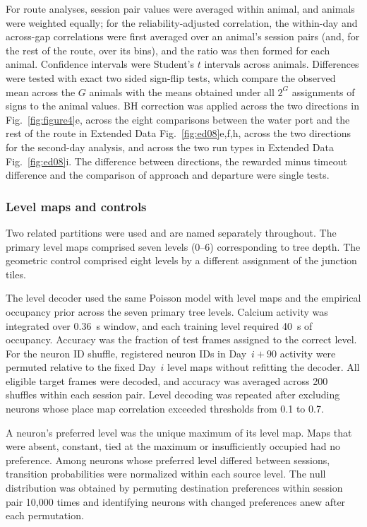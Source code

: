 \documentclass[fleqn,10pt]{wlscirep}
\begin{document}
For route analyses, session pair values were averaged within animal, and animals were weighted equally; for the reliability-adjusted correlation, the within-day and across-gap correlations were first averaged over an animal's session pairs (and, for the rest of the route, over its bins), and the ratio was then formed for each animal. Confidence intervals were Student's $t$ intervals across animals. Differences were tested with exact two sided sign-flip tests, which compare the observed mean across the $G$ animals with the means obtained under all $2^G$ assignments of signs to the animal values. BH correction was applied across the two directions in Fig.~\ref{fig:figure4}e, across the eight comparisons between the water port and the rest of the route in Extended Data Fig.~\ref{fig:ed08}e,f,h, across the two directions for the second-day analysis, and across the two run types in Extended Data Fig.~\ref{fig:ed08}i. The difference between directions, the rewarded minus timeout difference and the comparison of approach and departure were single tests. 

\subsubsection*{Level maps and controls}

Two related partitions were used and are named separately throughout. The primary level maps comprised seven levels (0--6) corresponding to tree depth. The geometric control comprised eight levels by a different assignment of the junction tiles. 

The level decoder used the same Poisson model with level maps and the empirical occupancy prior across the seven primary tree levels. Calcium activity was integrated over 0.36~s window, and each training level required 40~s of occupancy. Accuracy was the fraction of test frames assigned to the correct level. For the neuron ID shuffle, registered neuron IDs in Day~$i+90$ activity were permuted relative to the fixed Day~$i$ level maps without refitting the decoder. All eligible target frames were decoded, and accuracy was averaged across 200 shuffles within each session pair. Level decoding was repeated after excluding neurons whose place map correlation exceeded thresholds from 0.1 to 0.7.

A neuron's preferred level was the unique maximum of its level map. Maps that were absent, constant, tied at the maximum or insufficiently occupied had no preference. Among neurons whose preferred level differed between sessions, transition probabilities were normalized within each source level. The null distribution was obtained by permuting destination preferences within session pair 10,000 times and identifying neurons with changed preferences anew after each permutation. 
\end{document}
